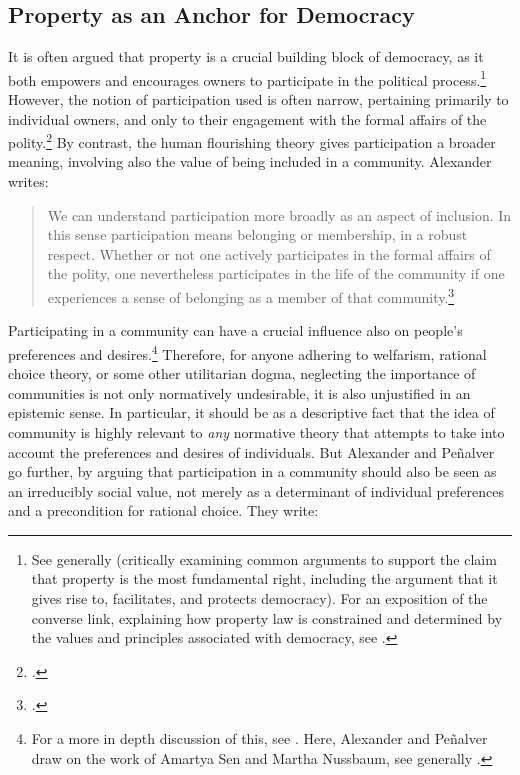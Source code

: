 \subsection{Property as an Anchor for Democracy}\label{sec:2:5:2}

It is often argued that property is a crucial building block of democracy, as it both empowers and encourages owners to participate in the political process.\footnote{See generally \cite{rose96} (critically examining common arguments to support the claim that property is the most fundamental right, including the argument that it gives rise to, facilitates, and protects democracy). For an exposition of the converse link, explaining how property law is constrained and determined by the values and principles associated with democracy, see \cite{singer14}.} However, the notion of participation used is often narrow, pertaining primarily to individual owners, and only to their engagement with the formal affairs of the polity.\footcite[1275]{alexander14} By contrast, the human flourishing theory gives participation a broader meaning, involving also the value of being included in a community. Alexander writes:

\begin{quote}
We can understand participation more broadly as an aspect of inclusion. In this sense participation means belonging or membership, in a robust respect. Whether or not one actively participates in the formal affairs of the polity, one nevertheless participates in the life of the community if one experiences a sense of belonging as a member of that community.\footcite[1275]{alexander14}
\end{quote}

Participating in a community can have a crucial influence also on people's preferences and desires.\footnote{For a more in depth discussion of this, see \cite[140]{alexander09}. Here, Alexander and Pe\~{n}alver draw on the work of Amartya Sen and Martha Nussbaum, see generally \cite{sen84,sen85,sen99,nussbaum00,nussbaum02}.} Therefore, for anyone adhering to welfarism, rational choice theory, or some other utilitarian dogma, neglecting the importance of communities is not only normatively undesirable, it is also unjustified in an epistemic sense. In particular, it should be  as a descriptive fact that the idea of community is highly relevant to {\it any} normative theory that attempts to take into account the preferences and desires of individuals. But Alexander and Pe\~{n}alver go further, by arguing that participation in a community should also be seen as an irreducibly social value, not merely as a determinant of individual preferences and a precondition for rational choice. They write:

